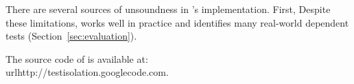 There are several sources of unsoundness in \ourtool's
implementation. First, 
Despite these limitations, \ourtool works well in practice
and identifies many real-world dependent tests (Section~\ref{sec:evaluation}).


The source code of \ourtool is available at:\\ url{http://testisolation.googlecode.com}.



